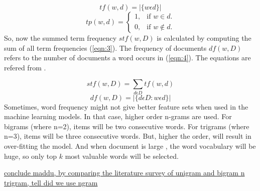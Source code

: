 \begin{equation}
\label{eqn:1}
tf(w,d) = |\{w \epsilon d\}|
\end{equation}
\begin{equation}
\label{eqn:2}
  tp(w,d)=\begin{cases}
    1, & \text{if $w \in d$}.\\
    0, & \text{if $w \not\in d$}.
  \end{cases}
\end{equation}
So, now the summed term frequency $stf(w,D)$ is calculated by computing the sum of all term frequencies (\ref{eqn:3}). The frequency of documents $df(w,D)$ refers to the number of documents a word occurs in (\ref{eqn:4}). The equations are refered from \cite{groot2012data}.

\begin{equation}
\label{eqn:3}
stf(w,D) = \sum_{d \epsilon D} tf(w,d)
\end{equation}
\begin{equation}
\label{eqn:4}
df(w,D) = |\{d \epsilon D: w \epsilon d \}|
\end{equation}
Sometimes, word frequency might not give better feature sets when used in the machine learning models. In that case, higher order n-grams are used. For bigrams (where n=2), items will be two consecutive words. For trigrams (where n=3), items will be three consecutive words. But, higher the order, will result in over-fitting the model. And when document is large , the word vocabulary will be huge, so only top $k$ most valuable words will be selected.

\underline{conclude maddu, by comparing the literature survey of unigram and bigram n trigram, tell did we use ngram}

